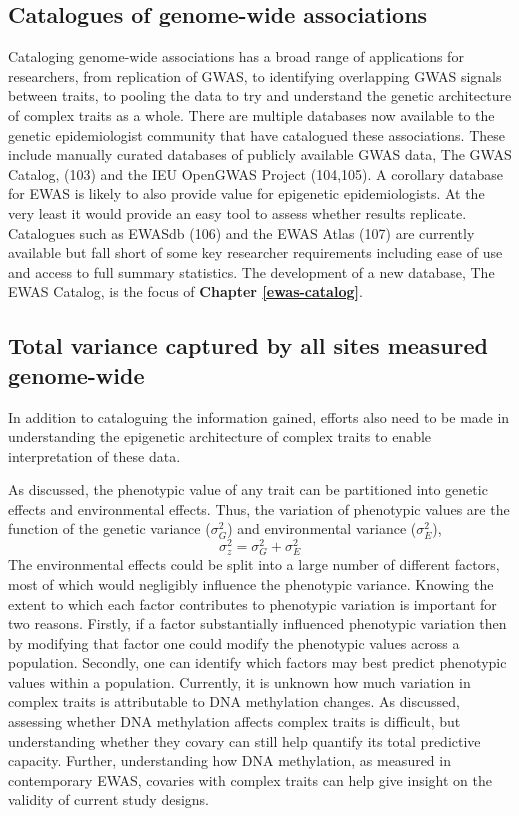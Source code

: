 \documentclass[11pt,twoside]{bristolthesis}
\begin{document}
\hypertarget{gwas-catalog}{%
\subsection{Catalogues of genome-wide associations}\label{gwas-catalog}}

Cataloging genome-wide associations has a broad range of applications for researchers, from replication of GWAS, to identifying overlapping GWAS signals between traits, to pooling the data to try and understand the genetic architecture of complex traits as a whole. There are multiple databases now available to the genetic epidemiologist community that have catalogued these associations. These include manually curated databases of publicly available GWAS data, The GWAS Catalog, (103) and the IEU OpenGWAS Project (104,105). A corollary database for EWAS is likely to also provide value for epigenetic epidemiologists. At the very least it would provide an easy tool to assess whether results replicate. Catalogues such as EWASdb (106) and the EWAS Atlas (107) are currently available but fall short of some key researcher requirements including ease of use and access to full summary statistics. The development of a new database, The EWAS Catalog, is the focus of \textbf{Chapter \ref{ewas-catalog}}.

\hypertarget{heritability}{%
\subsection{Total variance captured by all sites measured genome-wide}\label{heritability}}

In addition to cataloguing the information gained, efforts also need to be made in understanding the epigenetic architecture of complex traits to enable interpretation of these data.

As discussed, the phenotypic value of any trait can be partitioned into genetic effects and environmental effects. Thus, the variation of phenotypic values are the function of the genetic variance (\(\sigma^2_{G}\)) and environmental variance (\(\sigma^2_{E}\)),
\begin{equation}
    \sigma^2_{z} = \sigma^2_{G} + \sigma^2_{E}
    \label{eq:phenotypic-variance}
\end{equation}
The environmental effects could be split into a large number of different factors, most of which would negligibly influence the phenotypic variance. Knowing the extent to which each factor contributes to phenotypic variation is important for two reasons. Firstly, if a factor substantially influenced phenotypic variation then by modifying that factor one could modify the phenotypic values across a population. Secondly, one can identify which factors may best predict phenotypic values within a population. Currently, it is unknown how much variation in complex traits is attributable to DNA methylation changes. As discussed, assessing whether DNA methylation affects complex traits is difficult, but understanding whether they covary can still help quantify its total predictive capacity. Further, understanding how DNA methylation, as measured in contemporary EWAS, covaries with complex traits can help give insight on the validity of current study designs.
\end{document}
